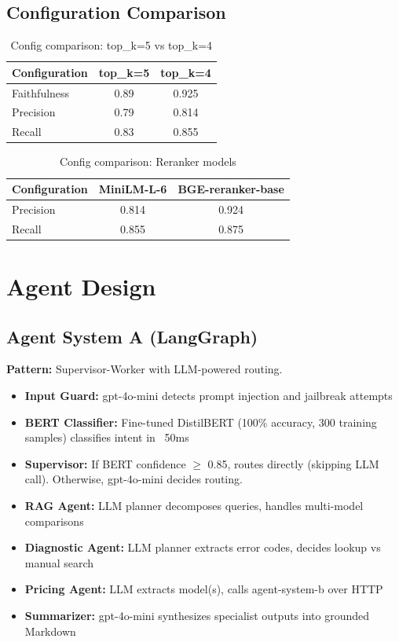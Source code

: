 \documentclass[12pt,a4paper]{article}
\begin{document}
\subsection{Configuration Comparison}

\begin{table}[H]
\centering
\begin{tabular}{lcc}
\toprule
\textbf{Configuration} & \textbf{top\_k=5} & \textbf{top\_k=4} \\
\midrule
Faithfulness & 0.89 & 0.925 \\
Precision & 0.79 & 0.814 \\
Recall & 0.83 & 0.855 \\
\bottomrule
\end{tabular}
\caption{Config comparison: top\_k=5 vs top\_k=4}
\end{table}

\begin{table}[H]
\centering
\begin{tabular}{lcc}
\toprule
\textbf{Configuration} & \textbf{MiniLM-L-6} & \textbf{BGE-reranker-base} \\
\midrule
Precision & 0.814 & 0.924 \\
Recall & 0.855 & 0.875 \\
\bottomrule
\end{tabular}
\caption{Config comparison: Reranker models}
\end{table}

\section{Agent Design}

\subsection{Agent System A (LangGraph)}

\textbf{Pattern:} Supervisor-Worker with LLM-powered routing.

\begin{itemize}
  \item \textbf{Input Guard:} gpt-4o-mini detects prompt injection and jailbreak attempts
  \item \textbf{BERT Classifier:} Fine-tuned DistilBERT (100\% accuracy, 300 training samples) classifies intent in ~50ms
  \item \textbf{Supervisor:} If BERT confidence $\geq$ 0.85, routes directly (skipping LLM call). Otherwise, gpt-4o-mini decides routing.
  \item \textbf{RAG Agent:} LLM planner decomposes queries, handles multi-model comparisons
  \item \textbf{Diagnostic Agent:} LLM planner extracts error codes, decides lookup vs manual search
  \item \textbf{Pricing Agent:} LLM extracts model(s), calls agent-system-b over HTTP
  \item \textbf{Summarizer:} gpt-4o-mini synthesizes specialist outputs into grounded Markdown
\end{itemize}
\end{document}
